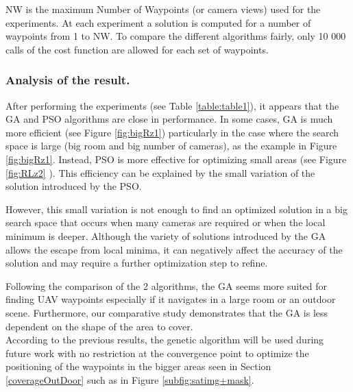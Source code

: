 NW is the maximum Number of Waypoints (or camera views) used for the experiments.  
At each experiment a solution is computed for a number of waypoints from 1  to NW. To compare the different algorithms fairly, only 10 000 calls of the cost function are allowed for each set of waypoints.\\

\subsubsection{ Analysis of the result.}

After performing the experiments (see Table \ref{table:table1}), it appears that the GA and PSO algorithms are close in performance. In some cases, GA is much more efficient (see Figure \ref{fig:bigRz1}) particularly in the case where the search space is large (big room and big number of cameras),  as the example in Figure \ref{fig:bigRz1}. Instead, PSO is more effective for optimizing small areas (see Figure \ref{fig:RLz2} ).
This efficiency can be explained by the small variation of the solution introduced by the PSO. 

However, this small variation is not enough to find an optimized solution in a big search space that occurs when many cameras are required or when the local minimum is deeper.
Although the variety of solutions introduced by the GA allows the escape from local minima, it can negatively affect the accuracy of the solution and may require a further optimization step to refine. 

%
%

 Following the comparison of the 2 algorithms, the GA seems more suited for finding UAV waypoints especially if it navigates in a large room or an outdoor scene.
Furthermore, our comparative study demonstrates that the GA is less dependent on the shape of the area to cover. \\
According to the previous results, the genetic algorithm will be used during future work with no restriction at the convergence point to optimize the positioning of the waypoints in the bigger areas seen in Section  \ref{coverageOutDoor} such as in Figure \ref{subfig:satimg+mask}.\\


